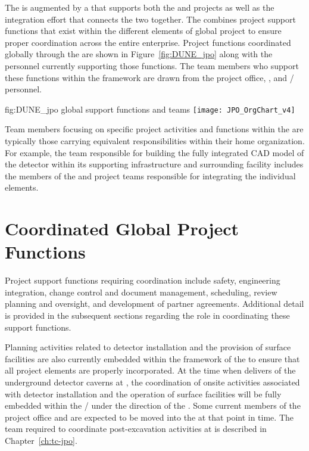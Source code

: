 The  is augmented by a  that supports both 
the  and  projects as well as the integration
effort that connects the two together. The  combines
project support functions that exist within the different elements 
of global project to ensure proper coordination across the entire 
 enterprise.  Project functions coordinated globally 
through the  are shown in Figure~\ref{fig:DUNE_jpo} along 
with the personnel currently supporting those functions.  The team 
members who support these functions within the  framework
are drawn from the  project office,  , 
and /  personnel.  
\begin{dunefigure}{fig:DUNE_jpo}
  { global support functions and teams}
  \texttt{[image: JPO\_OrgChart\_v4]}
\end{dunefigure}
Team members focusing on specific project activities and functions 
within the  are typically those carrying equivalent 
responsibilities within their home organization.  For example, 
the  team responsible for building the fully integrated 
\threed CAD model of the detector within its supporting infrastructure 
and surrounding facility includes the members of the  and 
 project teams responsible for integrating the individual 
elements.

\section{Coordinated Global Project Functions}
\label{sec:global_project}

Project support functions requiring  coordination include
safety, engineering integration, change control and document 
management, scheduling, review planning and oversight, and development 
of partner agreements.  Additional detail is provided in the subsequent 
sections regarding the  role in coordinating these support 
functions.

Planning activities related to detector installation and the provision 
of surface facilities are also currently embedded within the framework 
of the  to ensure that all project elements are properly 
incorporated.  At the time when   delivers 
 of the underground detector caverns at , the 
coordination of onsite activities associated with detector installation 
and the operation of surface facilities will be fully embedded within 
the /  under the direction of the .  
Some current members of the  project office and 
 are expected to be moved into the  at that point in time.  
The  team required to coordinate post-excavation activities at 
 is described in Chapter~\ref{ch:tc-jpo}.  

